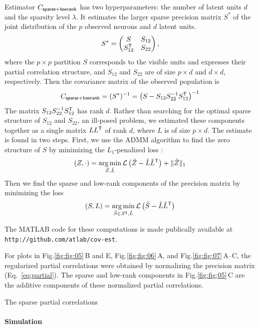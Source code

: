 \documentclass[10pt]{article}
\newcommand{\figref}[2]{Fig.\;\ref{fig:#1}\,#2}
\newcommand{\loss}[1]{\mathcal L\left(#1\right)}
\newcommand{\T}{{\sf T}}
\DeclareMathOperator*{\argmin}{arg\,min}
\begin{document}
Estimator $C_{\sf sparse+lowrank}$ has two hyperparameters: the number of latent units $d$ and the sparsity level $\lambda$. It estimates the larger sparse precision matrix $S^\ast$ of the joint distribution of the $p$ observed neurons and $d$ latent units.  
\begin{equation}
S^\ast=
\begin{pmatrix}
S & S_{12} \\
S_{12}^\T & S_{22}
\end{pmatrix},
\end{equation}
where the $p\times p$ partition $S$ corresponds to the visible units and expresses their partial correlation structure, and $S_{12}$ and $S_{22}$ are of size $p\times d$ and $d\times d$, respectively.
Then the covariance matrix of the observed population is 
\begin{equation}
C_{\sf sparse+lowrank} = (S^\ast)^{-1} = \left(S-S_{12}S_{22}^{-1}S_{12}^\T\right)^{-1}
\end{equation}
The matrix $ S_{12}S_{22}^{-1}S_{12}^\T$ has rank $d$. Rather than searching for the optimal sparse structure of $S_{12}$ and $S_{22}$, an ill-posed problem, we estimated these components together as a single matrix $LL^\T$ of rank $d$, where $L$ is of size $p\times d$.
The estimate is found in two steps. First, we use the ADMM algorithm to find the zero structure of $S$ by minimizing the $L_1$-penalized loss \cite{Chandrasekaran:2010,Ma:2013}:
\begin{equation}
(Z,\cdot) = \argmin\limits_{\tilde Z,\tilde L} \loss{\tilde Z-\tilde L\tilde L^\T} + \|\tilde Z\|_1
\end{equation}
Then we find the sparse and low-rank components of the precision matrix by minimizing the loss 
\begin{equation}
(S,L) = \argmin\limits_{\tilde S \in Z^\sharp,\tilde L} \loss{\tilde S-\tilde L \tilde L^\T}
\end{equation}

The MATLAB code for these computations is made publically available at {\tt http://github.com/atlab/cov-est}.

For plots in \figref{fig:05}{B and E}, \figref{fig:06}{A}, and \figref{fig:07}{A--C}, the regularized partial correlations were obtained by normalizing the precision matrix (Eq.~\ref{eq:partial}). The sparse and low-rank components in \figref{fig;05}{C} are the additive components of these normalized partial correlations. 

The sparse partial correlations 
\paragraph{Simulation}
\end{document}
